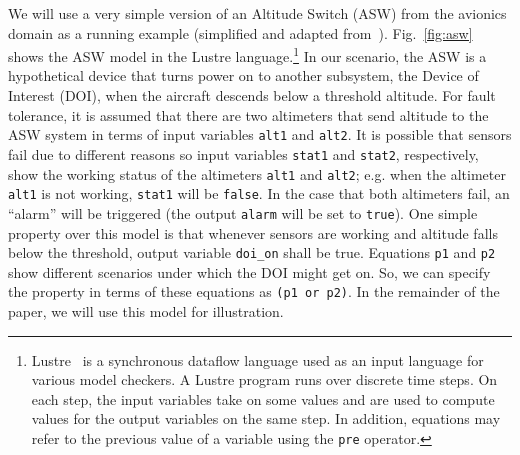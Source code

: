We will use a very simple version of an Altitude Switch (ASW) from the avionics domain as a running example (simplified and adapted from~\cite{HCW02:ase-deviation}).
Fig.~\ref{fig:asw} shows the ASW model in the Lustre language.\footnote{Lustre~\cite{Halbwachs91:lustre} is a synchronous dataflow language
used as an input language for various model checkers. A Lustre program runs over discrete
time steps. On each step, the input variables take on some values and
are used to compute values for the output variables on the same step.
In addition, equations may refer to the previous value of a variable
using the \small{{\tt pre}} operator.} In our scenario, the ASW is a hypothetical device that turns power on to another subsystem, the Device of Interest (DOI), when the aircraft descends below a threshold altitude.
For fault tolerance, it is assumed that there are two altimeters that send altitude to the ASW system in terms of input variables \texttt{alt1} and \texttt{alt2}.
It is possible that sensors fail due to different reasons so input variables \texttt{stat1} and \texttt{stat2}, respectively, show the working status of the altimeters \texttt{alt1} and \texttt{alt2}; e.g. when the altimeter \texttt{alt1} is not working, \texttt{stat1} will be \texttt{false}. In the case that both altimeters fail, an ``alarm'' will be triggered (the output \texttt{alarm} will be set to \texttt{true}).
One simple property over this model is that whenever sensors are working and altitude falls below the threshold, output variable \texttt{doi\_on} shall be true. Equations \texttt{p1} and \texttt{p2} show different scenarios under which the DOI might get on. So, we can specify the property in terms of these equations as \texttt{(p1 or p2)}.
In the remainder of the paper, we will use this model for illustration.
